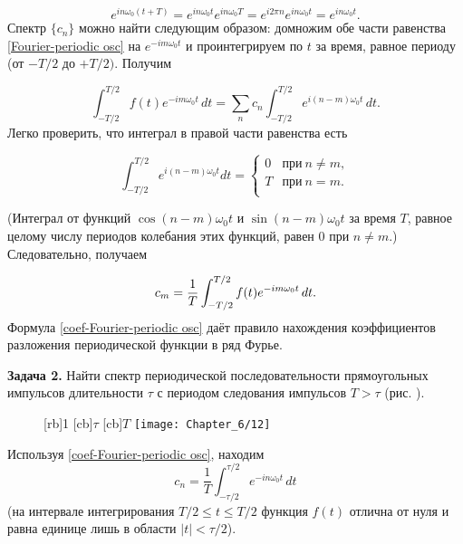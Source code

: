 \begin{equation*}
	e^{in\omega_0(t+T)}=e^{in\omega_0t}e^{in\omega_0T}=e^{i2\pi n}e^{in\omega_0t}=e^{in\omega_0t}.
\end{equation*}
Спектр $\{c_n\}$ можно найти следующим образом: домножим обе части равенства \eqref{Fourier-periodic osc} на $e^{-im\omega_0 t}$ и
проинтегрируем по $t$ за время, равное периоду (от $-T/2$ до $+T/2)$. Получим

\begin{equation*}
	\int_{-T/2}^{T/2} f(t)e^{-im\omega_0t}\,dt=\sum_n c_n\int_{-T/2}^{T/2} e^{i(n-m)\omega_0 t}\,dt.
\end{equation*}
Легко проверить, что интеграл в правой части равенства есть

\begin{equation*}
	\int_{-T/2}^{T/2}e^{i(n-m)\omega_0 t}dt =
	\begin{cases}
		0 & \text{при}~ n\ne m,\\
		T & \text{при}~ n = m.\\
	\end{cases}
\end{equation*}

(Интеграл от функций $\cos(n-m)\omega_0t$ и $\sin(n-m)\omega_0t$ за время $T$, равное целому числу периодов колебания этих
функций, равен 0 при $n\ne m$.) Следовательно, получаем

\begin{equation}
	\eqmark{coef-Fourier-periodic osc}
	c_m=\frac{1}{T}\int_{-T/2}^{T/2} f(t)e^{-im\omega_0 t}\,dt.
\end{equation}
Формула \eqref{coef-Fourier-periodic osc} даёт правило нахождения коэффициентов разложения периодической функции в ряд Фурье.

\textbf{Задача 2.} Найти спектр периодической последовательности прямоугольных импульсов длительности $\tau$ с периодом следования
импульсов $T>\tau$ (рис. ).
\begin{wrapfigure}[]{r}{0.4\textwidth}
	[rb]{1}
	[cb]{$\tau$}
	[cb]{$T$}
	\texttt{[image: Chapter\_6/12]}
	\caption{}
\end{wrapfigure}
Используя \eqref{coef-Fourier-periodic osc}, находим
\begin{equation*}
	c_n =\frac{1}{T}\int_{-\tau/2}^{\tau/2} e^{-in\omega_0 t}\,dt
\end{equation*}
(на интервале интегрирования $T/2\le t \le T/2$ функция $f(t)$ отлична от нуля и равна единице лишь в области
$|t|<\tau/2$). 

